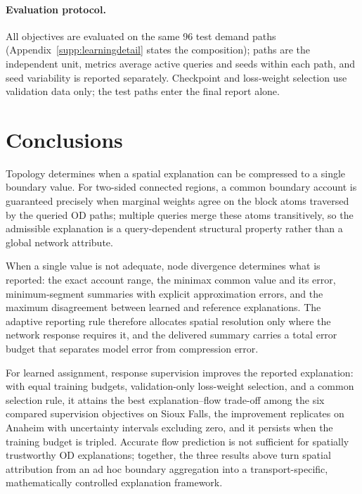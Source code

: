 \documentclass[a4paper,fleqn]{cas-sc}
\begin{document}
\paragraph{Evaluation protocol.}
All objectives are evaluated on the same 96 test demand paths
(Appendix~\ref{supp:learningdetail} states the composition); paths are
the independent unit, metrics average active queries and seeds within
each path, and seed variability is reported separately. Checkpoint and
loss-weight selection use validation data only; the test paths enter
the final report alone.



\section{Conclusions}\label{sec:conclusions}
Topology determines when a spatial explanation can be compressed to a
single boundary value. For two-sided connected regions, a common
boundary account is guaranteed precisely when marginal weights agree on
the block atoms traversed by the queried OD paths; multiple queries
merge these atoms transitively, so the admissible explanation is a
query-dependent structural property rather than a global network
attribute.

When a single value is not adequate, node divergence determines what is
reported: the exact account range, the minimax common value and its
error, minimum-segment summaries with explicit approximation errors,
and the maximum disagreement between learned and reference
explanations. The adaptive reporting rule therefore allocates spatial
resolution only where the network response requires it, and the
delivered summary carries a total error budget that separates model
error from compression error.

For learned assignment, response supervision improves the reported
explanation: with equal training budgets, validation-only loss-weight
selection, and a common selection rule, it attains the best
explanation--flow trade-off among the six compared supervision
objectives on Sioux Falls, the improvement replicates on Anaheim with
uncertainty intervals excluding zero, and it persists when the training
budget is tripled. Accurate flow prediction is not sufficient for
spatially trustworthy OD explanations; together, the three results
above turn spatial attribution from an ad hoc boundary aggregation into
a transport-specific, mathematically controlled explanation framework.
\end{document}
